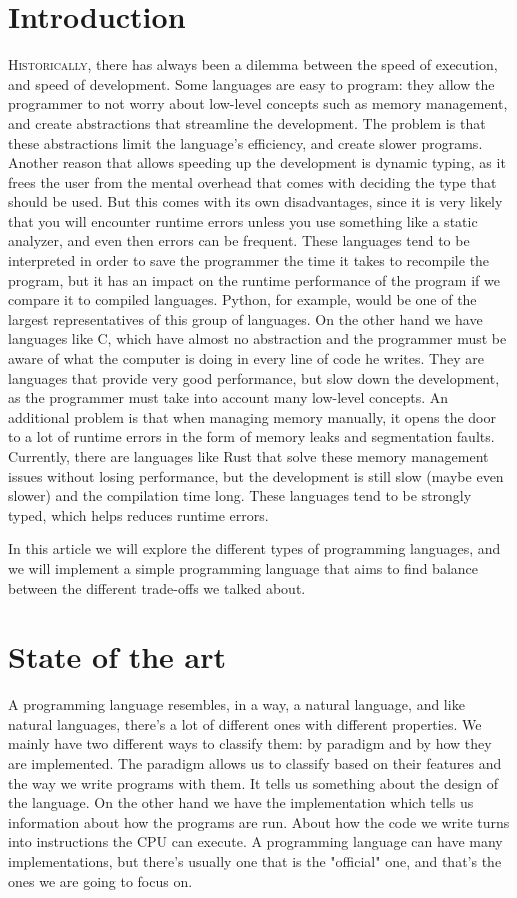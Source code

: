 ﻿\documentclass[10pt,a4paper,twocolumn,twoside]{article}
\begin{document}
\section{Introduction} \lettrine[lines=3]{H}{istorically}, there has always been
a dilemma between the speed of execution, and speed of development. Some
languages are easy to program: they allow the programmer to not worry about
low-level concepts such as memory management, and create abstractions that
streamline the development. The problem is that these abstractions limit the
language's efficiency, and create slower programs. Another reason that allows
speeding up the development is dynamic typing, as it frees the user from the
mental overhead that comes with deciding the type that should be used. But this
comes with its own disadvantages, since it is very likely that you will
encounter runtime errors unless you use something like a static analyzer, and
even then errors can be frequent. These languages tend to be interpreted in
order to save the programmer the time it takes to recompile the program, but it
has an impact on the runtime performance of the program if we compare it to
compiled languages. Python, for example, would be one of the largest
representatives of this group of languages. On the other hand we have languages
like C, which have almost no abstraction and the programmer must be aware of
what the computer is doing in every line of code he writes. They are languages
that provide very good performance, but slow down the development, as the
programmer must take into account many low-level concepts. An additional problem
is that when managing memory manually, it opens the door to a lot of runtime
errors in the form of memory leaks and segmentation faults. Currently, there are
languages like Rust that solve these memory management issues without losing
performance, but the development is still slow (maybe even slower) and the
compilation time long. These languages tend to be strongly typed, which helps
reduces runtime errors.

In this article we will explore the different types of programming languages,
and we will implement a simple programming language that aims to find balance
between the different trade-offs we talked about.

\section{State of the art}
A programming language resembles, in a way, a natural language, and like natural
languages, there's a lot of different ones with different properties. We mainly
have two different ways to classify them: by paradigm and by how they are
implemented. The paradigm allows us to classify based on their features and the
way we write programs with them. It tells us something about the design of the
language. On the other hand we have the implementation which tells us
information about how the programs are run. About how the code we write turns
into instructions the CPU can execute. A programming language can have many
implementations, but there's usually one that is the "official" one, and that's
the ones we are going to focus on.
\end{document}

